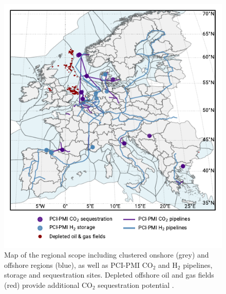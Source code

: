 \documentclass[pdflatex,sn-nature]{sn-jnl}%
\theoremstyle{thmstyleone}%
\theoremstyle{thmstyletwo}%
\theoremstyle{thmstylethree}%
\begin{document}
\begin{figure}[htbp]
  \centering
  \includegraphics{figures/map_adm_pcipmi}
  \caption{Map of the regional scope including clustered onshore (grey) and offshore regions (blue), as well as PCI-PMI CO$_2$ and H$_2$ pipelines, storage and sequestration sites. Depleted offshore oil and gas fields (red) provide additional CO$_2$ sequestration potential \cite{hofmannH2CO2Network2025}.}
  \label{fig:regional_scope_map}
\end{figure}
\end{document}
